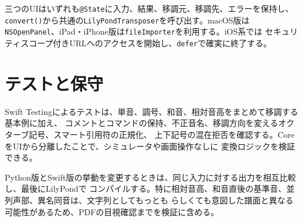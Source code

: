 \documentclass[uplatex,a4paper,11pt]{jsbook}
\begin{document}
三つのUIはいずれも\texttt{@State}に入力、結果、移調元、移調先、エラーを保持し、
\texttt{convert()}から共通の\texttt{LilyPondTransposer}を呼び出す。macOS版は
\texttt{NSOpenPanel}、iPad・iPhone版は\texttt{fileImporter}を利用する。iOS系では
セキュリティスコープ付きURLへのアクセスを開始し、\texttt{defer}で確実に終了する。





\chapter{テストと保守}

Swift Testingによるテストは、単音、調号、和音、相対音高をまとめて移調する基本例に加え、
コメントとコマンドの保持、不正音名、移調方向を変えるオクターブ記号、スマート引用符の正規化、
上下記号の混在拒否を確認する。CoreをUIから分離したことで、シミュレータや画面操作なしに
変換ロジックを検証できる。



Python版とSwift版の挙動を変更するときは、同じ入力に対する出力を相互比較し、最後にLilyPondで
コンパイルする。特に相対音高、和音直後の基準音、並列声部、異名同音は、文字列としてもっとも
らしくても意図した譜面と異なる可能性があるため、PDFの目視確認までを検証に含める。
\end{document}
